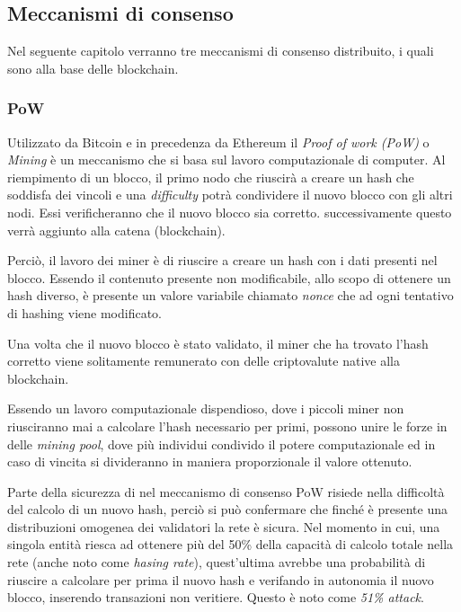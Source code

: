 \subsection{Meccanismi di consenso}
\label{sec:consensoDistribuito}
Nel seguente capitolo verranno tre meccanismi di consenso distribuito, i quali sono alla base delle blockchain.

\subsubsection{PoW}
\label{sec:PoW}
Utilizzato da Bitcoin e in precedenza da Ethereum il \textit{Proof of work (PoW)} o \textit{Mining} è un meccanismo che si basa sul lavoro computazionale di computer. 
Al riempimento di un blocco, il primo nodo che riuscirà a creare un hash che soddisfa dei vincoli e una \textit{difficulty} potrà condividere il nuovo blocco con gli altri nodi. Essi verificheranno che il nuovo blocco sia corretto. successivamente questo verrà aggiunto alla catena (blockchain). \cite{binance-pow}

Perciò, il lavoro dei miner è di riuscire a creare un hash con i dati presenti nel blocco.
Essendo il contenuto presente non modificabile, allo scopo di ottenere un hash diverso, è presente un valore variabile chiamato \textit{nonce} che ad ogni tentativo di hashing viene modificato.

Una volta che il nuovo blocco è stato validato, il miner che ha trovato l'hash corretto viene solitamente remunerato con delle criptovalute native alla blockchain. \cite{binance-pow}

Essendo un lavoro computazionale dispendioso, dove i piccoli miner non riusciranno mai a calcolare l'hash necessario per primi, possono unire le forze in delle \textit{mining pool}, dove più individui condivido il potere computazionale ed in caso di vincita si divideranno in maniera proporzionale il valore ottenuto. \cite{bitpanda-miningPool}

Parte della sicurezza di nel meccanismo di consenso PoW risiede nella difficoltà del calcolo di un nuovo hash, perciò si può confermare che finché è presente una distribuzioni omogenea dei validatori la rete è sicura.
Nel momento in cui, una singola entità riesca ad ottenere più del 50\% della capacità di calcolo totale nella rete (anche noto come \textit{hasing rate}), quest'ultima avrebbe una probabilità di riuscire a calcolare per prima il nuovo hash e verifando in autonomia il nuovo blocco, inserendo transazioni non veritiere. Questo è noto come \textit{51\% attack}. \cite{coindesk-51attack}

